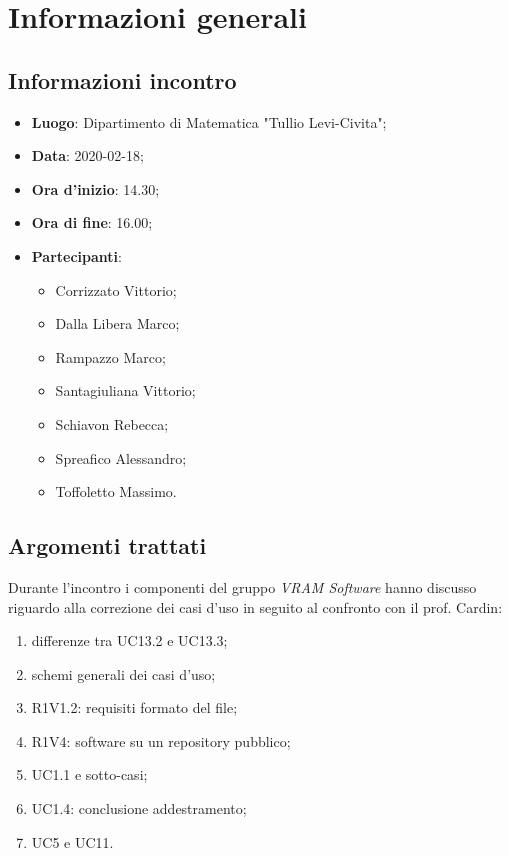 \section{Informazioni generali}
    \subsection{Informazioni incontro}
        \begin{itemize}
 	    \item \textbf{Luogo}: Dipartimento di Matematica "Tullio Levi-Civita";
		\item \textbf{Data}: 2020-02-18;
		\item \textbf{Ora d'inizio}: 14.30;
		\item \textbf{Ora di fine}: 16.00;
		\item \textbf{Partecipanti}: 
		\begin{itemize}
			\item Corrizzato Vittorio;
			\item Dalla Libera Marco;
			\item Rampazzo Marco;
			\item Santagiuliana Vittorio;
			\item Schiavon Rebecca;
			\item Spreafico Alessandro;
			\item Toffoletto Massimo.
        \end{itemize}
        \end{itemize}
    \subsection{Argomenti trattati}
		Durante l'incontro i componenti del gruppo \textit{VRAM Software} hanno discusso riguardo alla correzione dei casi d'uso in seguito al confronto con il prof. Cardin:
        \begin{enumerate}
        	\item differenze tra UC13.2 e UC13.3;
        	\item schemi generali dei casi d'uso\glo;
            \item R1V1.2: requisiti formato del file;
            \item R1V4: software su un repository pubblico;
            \item UC1.1 e sotto-casi;
            \item UC1.4: conclusione addestramento;
            \item UC5 e UC11.
        \end{enumerate}
